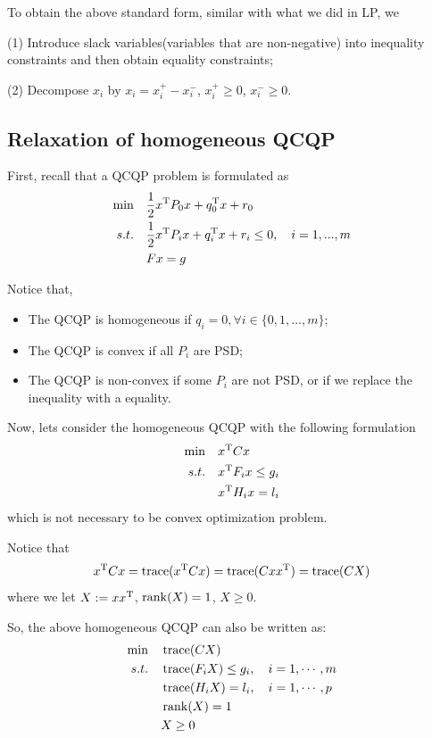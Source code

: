 To obtain the above standard form, similar with what we did in LP, we

(1) Introduce slack variables(variables that are non-negative) into inequality constraints and then obtain equality constraints;
	
(2) Decompose $x_i$ by $x_i = x_i^+ - x_i^-$, $x_i^+\geq 0$, $x_i^-\geq 0$.


\vspace{0.5cm}
\subsection{Relaxation of homogeneous QCQP}
First, recall that a QCQP problem is formulated as 
\begin{align*}
\min \quad&\frac{1}{2}x^{{\rm T}}P_0x + q_0^{{\rm T}}x + r_0 \\
s.t. \quad&\frac{1}{2}x^{{\rm T}}P_ix + q_i^{{\rm T}}x + r_i\leq 0,\quad i = 1,...,m\\
&Fx = g
\end{align*}

Notice that,
\begin{itemize}
	\item The QCQP is homogeneous if $q_i = 0, \forall i\in \{0,1,...,m \}$;
	
	\item The QCQP is convex if all $P_i$ are PSD;
	
	\item The QCQP is non-convex if some $P_i$ are not PSD, or if we replace the inequality with a equality.
	
\end{itemize}

\vspace{0.3cm}
Now, lets consider the homogeneous QCQP with the following formulation
\begin{align*}
\min \quad&x^{{\rm T}}Cx \\
s.t. \quad&x^{{\rm T}}F_ix \leq g_i\\
&x^{{\rm T}}H_ix = l_i
\end{align*}
which is not necessary to be convex optimization problem.

Notice that
\begin{equation*}
x^{{\rm T}}Cx = \operatorname{trace}(x^{{\rm T}}Cx) = \operatorname{trace}(Cxx^{{\rm T}}) = \operatorname{trace}(CX)
\end{equation*}
where we let $X := xx^{{\rm T}}$, $\operatorname{rank}(X) = 1$, $X\geq0$. 

So, the above homogeneous QCQP can also be written as:
\begin{align*}
\min \quad&\operatorname{trace}(CX) \\
s.t. \quad&\operatorname{trace}(F_iX) \leq g_i, \quad i = 1,\cdots,m\\
&\operatorname{trace}(H_iX) = l_i, \quad i = 1,\cdots,p\\
&\operatorname{rank}(X) = 1\\
&X\geq 0
\end{align*}

